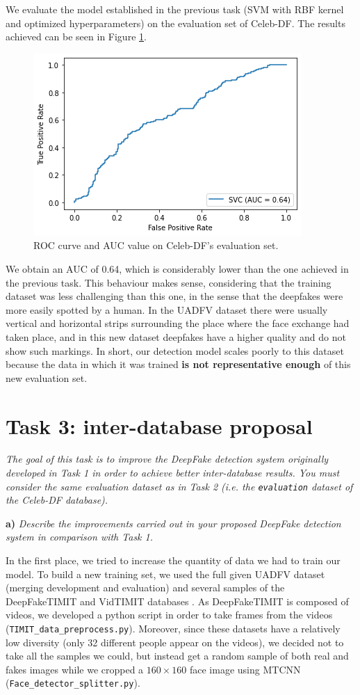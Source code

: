 \documentclass[11pt]{article}
\begin{document}
We evaluate the model established in the previous task (SVM with RBF kernel and optimized hyperparameters) on the evaluation set of Celeb-DF. The results achieved can be seen in Figure \ref{fig:t2}.

\begin{figure}[h!]
  \centering
  \includegraphics[width=.6\textwidth]{img/2-roc-celeb}
  \caption{ROC curve and AUC value on Celeb-DF's evaluation set.}
  \label{fig:t2}
\end{figure}

We obtain an AUC of 0.64, which is considerably lower than the one achieved in the previous task. This behaviour makes sense, considering that the training dataset was less challenging than this one, in the sense that the deepfakes were more easily spotted by a human. In the UADFV dataset there were usually vertical and horizontal strips surrounding the place where the face exchange had taken place, and in this new dataset deepfakes have a higher quality and do not show such markings. In short, our detection model scales poorly to this dataset because the data in which it was trained \textbf{is not representative enough} of this new evaluation set.


\section*{Task 3: inter-database proposal}

\textit{The goal of this task is to improve the DeepFake detection system originally developed in Task 1 in order to achieve better inter-database results. You must consider the same evaluation dataset as in Task 2 (i.e. the \texttt{evaluation} dataset of the Celeb-DF database).}

\textbf{a)} \textit{Describe the improvements carried out in your proposed DeepFake detection system in comparison with Task 1.}

In the first place, we tried to increase the quantity of data we had to train our model. To build a new training set, we used the full given UADFV dataset (merging development and evaluation) and several samples of the DeepFakeTIMIT and VidTIMIT databases \citep{sanderson2009multi}. As DeepFakeTIMIT is composed of videos, we developed a python script in order to take frames from the videos (\texttt{TIMIT\_data\_preprocess.py}). Moreover, since these datasets have a relatively low diversity (only 32 different people appear on the videos), we decided not to take all the samples we could, but instead get a random sample of both real and fakes images while we cropped a \( 160 \times 160 \) face image using MTCNN (\texttt{Face\_detector\_splitter.py}).
\end{document}
